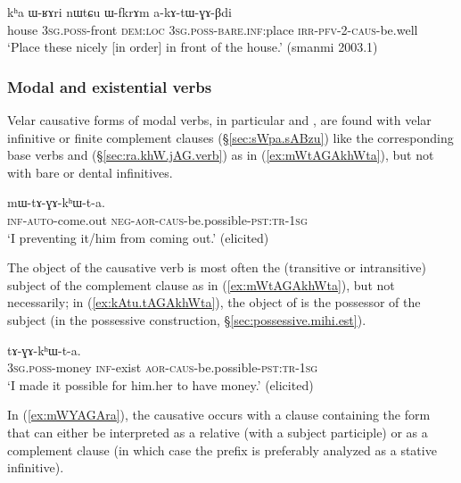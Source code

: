 \begin{exe}
\ex \label{ex:akAtWGABdi}
\gll  kʰa ɯ-ʁɤri nɯtɕu ɯ-fkrɤm a-kɤ-tɯ-ɣɤ-βdi \\
house \textsc{3sg}.\textsc{poss}-front \textsc{dem}:\textsc{loc} \textsc{3sg}.\textsc{poss}-\textsc{bare}.\textsc{inf}:place \textsc{irr}-\textsc{pfv}-2-\textsc{caus}-be.well \\
\glt `Place these nicely [in order] in front of the house.' (smanmi 2003.1)
\end{exe}

\subsubsection{Modal and existential verbs} \label{sec:velar.caus.modal}
Velar causative forms of modal verbs, in particular  and  , are found with velar infinitive or finite complement clauses (§\ref{sec:sWpa.sABzu}) like the corresponding base verbs  and  (§\ref{sec:ra.khW.jAG.verb}) as in (\ref{ex:mWtAGAkhWta}), but not with bare or dental infinitives.

\begin{exe}
\ex \label{ex:mWtAGAkhWta}
\gll  [kɤ-nɯ-ɬoʁ] mɯ-tɤ-ɣɤ-kʰɯ-t-a. \\
  \textsc{inf}-\textsc{auto}-come.out \textsc{neg}-\textsc{aor}-\textsc{caus}-be.possible-\textsc{pst}:\textsc{tr}-\textsc{1sg} \\
\glt `I preventing it/him from coming out.' (elicited)
\end{exe}

The object of the causative verb is most often the (transitive or intransitive) subject of the complement clause as in (\ref{ex:mWtAGAkhWta}), but not necessarily; in (\ref{ex:kAtu.tAGAkhWta}), the object of  is the possessor of the subject (in the possessive construction, §\ref{sec:possessive.mihi.est}).

\begin{exe}
\ex \label{ex:kAtu.tAGAkhWta}
\gll [ɯ-rŋɯl kɤ-tu] tɤ-ɣɤ-kʰɯ-t-a. \\
\textsc{3sg}.\textsc{poss}-money \textsc{inf}-exist \textsc{aor}-\textsc{caus}-be.possible-\textsc{pst}:\textsc{tr}-\textsc{1sg} \\
\glt `I made it possible for him.her to have money.'  (elicited)
\end{exe}

In (\ref{ex:mWYAGAra}), the causative  occurs with a clause containing the form  that can either be interpreted as a relative (with a subject participle) or as a complement clause (in which case the  prefix is preferably analyzed as a stative infinitive).

